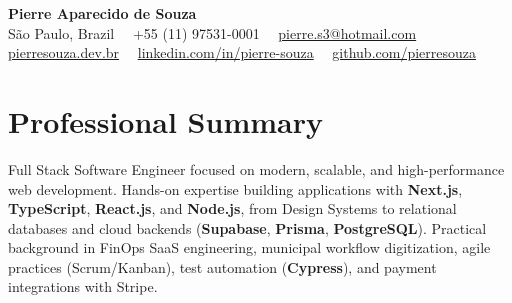 \documentclass[a4paper,10pt]{article}
\begin{document}
\pagestyle{empty}

\begin{center}
    {\LARGE \textbf{Pierre Aparecido de Souza}} \\ \vspace{2pt}
    \small São Paulo, Brazil \ \textbar \ +55 (11) 97531-0001 \ \textbar \ \href{mailto:pierre.s3@hotmail.com}{pierre.s3@hotmail.com} \\ \vspace{1pt}
    \href{https://pierresouza.dev.br}{pierresouza.dev.br} \ \textbar \ \href{https://linkedin.com/in/pierre-souza}{linkedin.com/in/pierre-souza} \ \textbar \ \href{https://github.com/pierresouza}{github.com/pierresouza}
\end{center}
\vspace{-6pt}

\section{Professional Summary}
\small{
Full Stack Software Engineer focused on modern, scalable, and high-performance web development. Hands-on expertise building applications with \textbf{Next.js}, \textbf{TypeScript}, \textbf{React.js}, and \textbf{Node.js}, from Design Systems to relational databases and cloud backends (\textbf{Supabase}, \textbf{Prisma}, \textbf{PostgreSQL}). Practical background in FinOps SaaS engineering, municipal workflow digitization, agile practices (Scrum/Kanban), test automation (\textbf{Cypress}), and payment integrations with Stripe.
}

\end{document}
